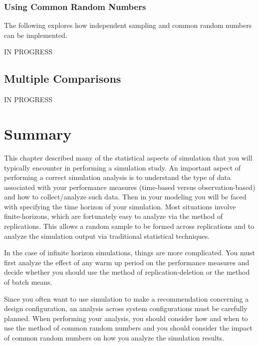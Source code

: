 \documentclass[
]{book}
\theoremstyle{definition}
\theoremstyle{definition}
\theoremstyle{definition}
\theoremstyle{definition}
\theoremstyle{remark}
\begin{document}
\hypertarget{simoa:comparingSystems:CRN}{%
\subsubsection{Using Common Random Numbers}\label{simoa:comparingSystems:CRN}}

The following explores how independent sampling and common random
numbers can be implemented.

IN PROGRESS

\hypertarget{simoa:comparingSystems:MCB}{%
\subsection{Multiple Comparisons}\label{simoa:comparingSystems:MCB}}

IN PROGRESS

\hypertarget{simoa:summary}{%
\section{Summary}\label{simoa:summary}}

This chapter described many of the statistical aspects of simulation
that you will typically encounter in performing a simulation study. An
important aspect of performing a correct simulation analysis is to
understand the type of data associated with your performance measures
(time-based versus observation-based) and how to collect/analyze such
data. Then in your modeling you will be faced with specifying the time
horizon of your simulation. Most situations involve finite-horizons,
which are fortunately easy to analyze via the method of replications.
This allows a random sample to be formed across replications and to
analyze the simulation output via traditional statistical techniques.

In the case of infinite horizon simulations, things are more
complicated. You must first analyze the effect of any warm up period on
the performance measures and decide whether you should use the method of
replication-deletion or the method of batch means.

Since you often want to use simulation to make a recommendation
concerning a design configuration, an analysis across system
configurations must be carefully planned. When performing your analysis,
you should consider how and when to use the method of common random
numbers and you should consider the impact of common random numbers on
how you analyze the simulation results.
\end{document}
